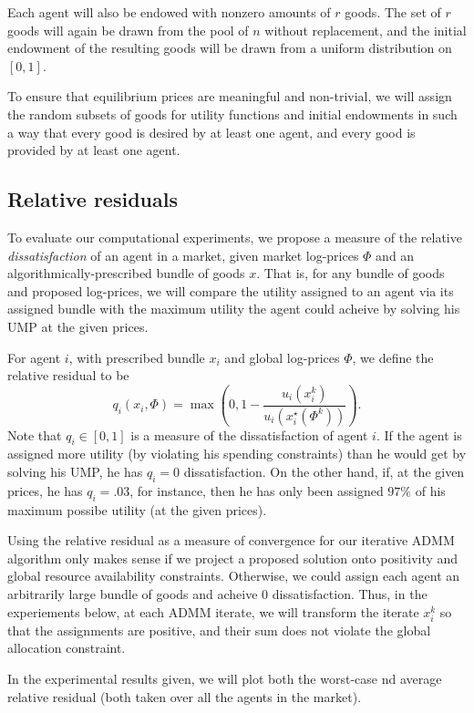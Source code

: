 \documentclass[12pt]{article}
\begin{document}
Each agent will also be endowed with nonzero amounts of $r$
goods.
The set of $r$ goods will again be drawn from the pool of $n$
without replacement, and the initial endowment of
the resulting goods will be drawn from a uniform distribution on
$[0,1]$.

To ensure that equilibrium prices are meaningful and non-trivial,
we will assign the random subsets of goods for utility functions and
initial endowments in such a way that every good is desired by at least one agent, and every good is provided by at least one agent.

\subsection{Relative residuals}
To evaluate our computational experiments, we propose a measure of
the relative \emph{dissatisfaction} of an agent in a market, given
market log-prices $\Phi$ and an algorithmically-prescribed bundle of goods
$x$.
That is, for any bundle of goods and proposed log-prices, we will compare the
utility assigned to an agent via its assigned bundle with the maximum utility
the agent could acheive by solving his UMP at the given prices.

For agent $i$, with prescribed bundle $x_i$ and global log-prices $\Phi$,
we define the relative residual to be
\[
q_i(x_i, \Phi)= \max\left(0,1-\frac{u_i(x_i^k)}{u_i(x_i^\star(\Phi^k))}\right).
\]
Note that $q_i \in [0,1]$ is a measure of the dissatisfaction of agent $i$.
If the agent is assigned more utility (by violating his spending constraints) than he would get by solving his UMP, he has $q_i = 0$ dissatisfaction.
On the other hand, if, at the given prices, he has $q_i = .03$, for instance, then he has only been assigned $97\%$ of his maximum possibe utility (at the given prices).

Using the relative residual as a measure of convergence for our iterative ADMM
algorithm only makes sense if we project a proposed solution onto positivity and
global resource availability constraints. Otherwise, we could assign each agent an arbitrarily large bundle of goods and acheive 0 dissatisfaction.
Thus, in the experiements below, at each ADMM iterate, we will transform the iterate $x_i^k$ so that the assignments are positive, and their sum does not violate the global allocation constraint.

In the experimental results given, we will plot both the worst-case nd average relative residual (both taken over all the agents in the market).
\end{document}

